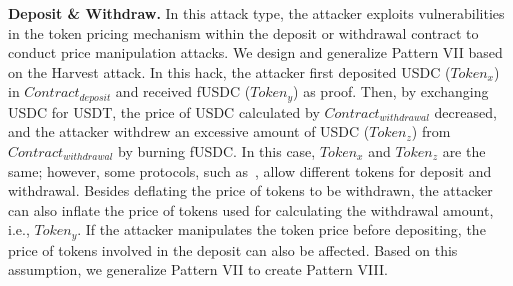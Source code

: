 \noindent\textbf{Deposit \& Withdraw.}
In this attack type, the attacker exploits vulnerabilities in the token pricing mechanism within the deposit or withdrawal contract to conduct price manipulation attacks.
We design and generalize Pattern VII based on the Harvest attack.
In this hack, the attacker first deposited USDC ($Token_x$) in $Contract_{deposit}$ and received fUSDC ($Token_y$) as proof.
Then, by exchanging USDC for USDT, the price of USDC calculated by $Contract_{withdrawal}$ decreased, and the attacker withdrew an excessive amount of USDC ($Token_z$) from $Contract_{withdrawal}$ by burning fUSDC.
In this case, $Token_x$ and $Token_z$ are the same; however, some protocols, such as~\cite{LUSD}, allow different tokens for deposit and withdrawal.
Besides deflating the price of tokens to be withdrawn, the attacker can also inflate the price of tokens used for calculating the withdrawal amount, i.e., $Token_y$.
If the attacker manipulates the token price before depositing, the price of tokens involved in the deposit can also be affected.
Based on this assumption, we generalize Pattern VII to create Pattern VIII.


